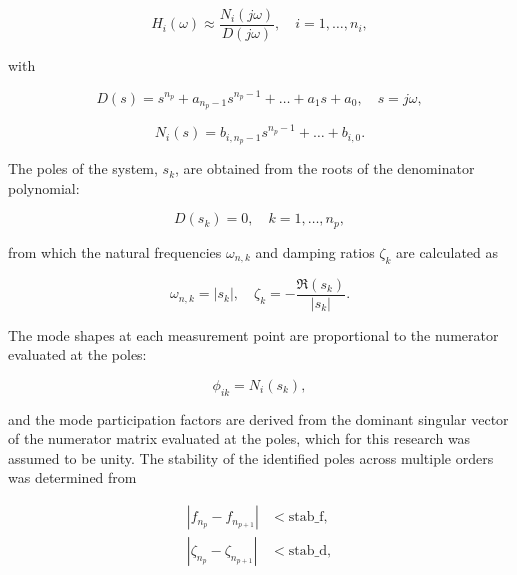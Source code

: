 \documentclass[colorlinks,upint,subscriptcorrection,varvw,hyphenate,balance,govt]{asmeconf}
\begin{document}
\begin{equation}\label{eq:rat_approx}
    H_i(\omega) \approx \frac{N_i(j\omega)}{D(j\omega)}, \quad i=1,\dots,n_i,
\end{equation}

\noindent
with

\begin{equation}\label{eq:denominator}
    D(s) = s^{n_p} + a_{n_p-1} s^{n_p-1} + \dots + a_1 s + a_0, \quad s = j\omega,
\end{equation}

\begin{equation}\label{eq:numerator}
    N_i(s) = b_{i,n_p-1} s^{n_p-1} + \dots + b_{i,0}.
\end{equation}

\noindent
The poles of the system, $s_k$, are obtained from the roots of the denominator polynomial:

\begin{equation}\label{eq:poles}
    D(s_k) = 0, \quad k=1,\dots,n_p,
\end{equation}

\noindent
from which the natural frequencies $\omega_{n,k}$ and damping ratios $\zeta_k$ are calculated as

\begin{equation}\label{eq:freq_damp}
    \omega_{n,k} = |s_k|, \quad \zeta_k = -\frac{\Re(s_k)}{|s_k|}.
\end{equation}

\noindent
The mode shapes at each measurement point are proportional to the numerator evaluated at the poles:

\begin{equation}\label{eq:mode_shapes}
    \phi_{ik} = N_i(s_k),
\end{equation}

\noindent
and the mode participation factors are derived from the dominant singular vector of the numerator matrix evaluated at the poles, which for this research was assumed to be unity. The stability of the identified poles across multiple orders was determined from

\begin{equation}\label{eq:stab_criteria}
    \begin{aligned}
        |f_{n_p} - f_{n_{p+1}}|         & < \text{stab\_f}, \\
        |\zeta_{n_p} - \zeta_{n_{p+1}}| & < \text{stab\_d}, \\
    \end{aligned}
\end{equation}
\end{document}

